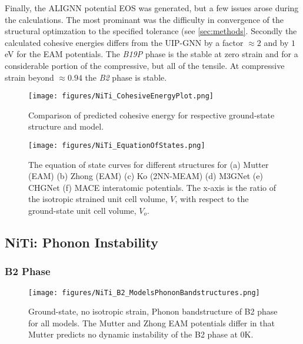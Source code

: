 \documentclass[preprint]{elsarticle}
\begin{document}
Finally, the ALIGNN potential EOS was generated, but a few issues arose during the calculations. The most prominant was the difficulty in convergence of the structural optimzation to the specified tolerance (see \ref{sec:methods}. Secondly the calculated cohesive energies differs from the UIP-GNN by a factor $\approx 2$ and by $1$ eV for the EAM potentials. The \textit{B19P} phase is the stable at zero strain and for a considerable portion of the compressive, but all of the tensile. At compressive strain beyond $\approx 0.94$ the \textit{B2} phase is stable. 

\begin{figure}[ht!]
    \begin{centering}
        \texttt{[image: figures/NiTi\_CohesiveEnergyPlot.png]}
        \caption{
          Comparison of predicted cohesive energy for respective ground-state structure and model.
        }
        \label{fig:ecoh}
    \end{centering}
\end{figure}


\begin{figure}[ht!]
    \begin{centering}
        \texttt{[image: figures/NiTi\_EquationOfStates.png]}
        \caption{
            The equation of state curves for different  structures for (a) Mutter (EAM) (b) Zhong (EAM) (c) Ko (2NN-MEAM) (d) M3GNet (e) CHGNet (f) MACE interatomic potentials. The x-axis is the ratio of the isotropic strained unit cell volume, $V$,  with respect to the ground-state unit cell volume, $V_o$.
        }
        \label{fig:eos}
    \end{centering}
\end{figure}

\subsection{NiTi: Phonon Instability}
\label{subsec:niphonons}


\subsubsection{B2 Phase}
\label{subsubsec:b2}

\begin{figure}[!htp]
    \begin{centering}
        \texttt{[image: figures/NiTi\_B2\_ModelsPhononBandstructures.png]}
        \caption{
          Ground-state, no isotropic strain, Phonon bandstructure of B2 phase for all models. The Mutter and Zhong EAM potentials differ in that Mutter predicts no dynamic instability of the B2 phase at 0K. 
        }
        \label{fig:allmodels_b2}
    \end{centering}
\end{figure}
\end{document}
